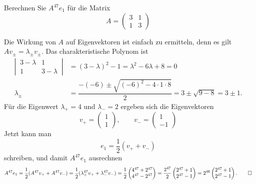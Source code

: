 Berechnen Sie $A^{47}e_1$ für die Matrix
\[
A=\begin{pmatrix}
3&1\\
1&3
\end{pmatrix}
\]


\begin{loesung}
Die Wirkung von $A$ auf Eigenvektoren ist einfach zu ermitteln,
denn es gilt $Av_{\pm}=\lambda_{\pm}v_{\pm}$.
Das charakteristische Polynom ist
\begin{align*}
\left|\,\begin{matrix}3-\lambda&1\\1&3-\lambda\end{matrix}\,\right|
&=
(3-\lambda)^2-1=\lambda^2-6\lambda+8=0
\\
\lambda_{\pm}&=\dfrac{-(-6)\pm\sqrt{(-6)^2-4\cdot 1 \cdot 8}}{2} = 3\pm\sqrt{9-8}=3\pm1.
\end{align*}
Für die Eigenwert $\lambda_+=4$ und $\lambda_-=2$ ergeben sich die
Eigenvektoren
\[
v_+=\begin{pmatrix}1\\1\end{pmatrix},\qquad
v_-=\begin{pmatrix}1\\-1\end{pmatrix}
\]
Jetzt kann man
\[
e_1=\frac12(v_++v_-)
\]
schreiben, und damit $A^{47}e_1$ ausrechnen
\[
A^{47}e_1=\frac12(A^{47}v_++A^{47}v_-)=\frac12( \lambda_+^{47}v_++\lambda_-^{47}v_-)
=\frac12\begin{pmatrix}
4^{47}+2^{47}\\
4^{47}-2^{47}
\end{pmatrix}
=\frac{2^{47}}2\begin{pmatrix}
2^{47}+1\\
2^{47}-1
\end{pmatrix}
=2^{46}\begin{pmatrix}
2^{47}+1\\
2^{47}-1
\end{pmatrix}.
\qedhere
\]
\end{loesung}

